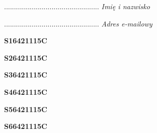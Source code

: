 \begin{turn}{90}\begin{minipage}{\linewidth} \vspace{20mm} ................................................  \textit{Imię i nazwisko}\end{minipage}\end{turn}

\begin{turn}{90}\begin{minipage}{\linewidth} \vspace{20mm} ................................................  \textit{Adres e-mailowy}\end{minipage}\end{turn}

\begin{turn}{90}\huge \begin{minipage}{\linewidth} \vspace{10mm}\textbf{S16421115C}\end{minipage}\end{turn}

\begin{turn}{90}\huge \begin{minipage}{\linewidth} \vspace{10mm}\textbf{S26421115C}\end{minipage}\end{turn}

\begin{turn}{90}\huge \begin{minipage}{\linewidth} \vspace{10mm}\textbf{S36421115C}\end{minipage}\end{turn}

\begin{turn}{90}\huge \begin{minipage}{\linewidth} \vspace{10mm}\textbf{S46421115C}\end{minipage}\end{turn}

\begin{turn}{90}\huge \begin{minipage}{\linewidth} \vspace{10mm}\textbf{S56421115C}\end{minipage}\end{turn}

\begin{turn}{90}\huge \begin{minipage}{\linewidth} \vspace{10mm}\textbf{S66421115C}\end{minipage}\end{turn}

